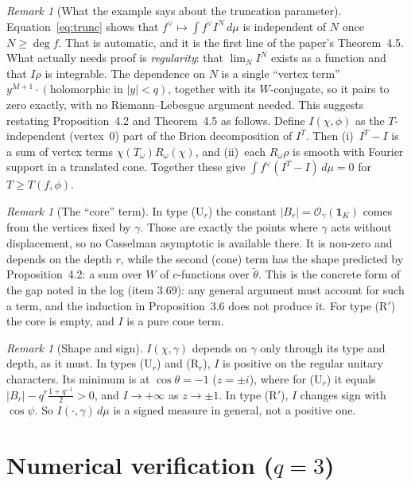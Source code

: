 \documentclass[11pt]{article}
\theoremstyle{remark}
\newtheorem{remark}[proposition]{Remark}
\newcommand{\OO}{\mathcal{O}}
\begin{document}
\begin{remark}[What the example says about the truncation parameter]\label{rem:T}
Equation~\eqref{eq:trunc} shows that $f^\vee\mapsto\int f^\vee I^N\,d\mu$ is independent of $N$ once $N\ge\deg f$. That is automatic, and it is the first line of the paper's Theorem~4.5. What actually needs proof is \emph{regularity}: that $\lim_N I^N$ exists as a function and that $I\rho$ is integrable. The dependence on $N$ is a single ``vertex term'' $y^{M+1}\cdot(\text{holomorphic in }|y|<q)$, together with its $W$-conjugate, so it pairs to zero exactly, with no Riemann--Lebesgue argument needed. This suggests restating Proposition~4.2 and Theorem~4.5 as follows. Define $I(\chi,\phi)$ as the $T$-independent (vertex~$0$) part of the Brion decomposition of $I^T$. Then (i)~$I^T-I$ is a sum of vertex terms $\chi(T_\omega)R_\omega(\chi)$, and (ii)~each $R_\omega\rho$ is smooth with Fourier support in a translated cone. Together these give $\int f^\vee(I^T-I)\,d\mu=0$ for $T\ge T(f,\phi)$.
\end{remark}

\begin{remark}[The ``core'' term]
In type (U$_r$) the constant $|B_r|=\OO_\gamma(\mathbf 1_K)$ comes from the vertices fixed by $\gamma$. Those are exactly the points where $\gamma$ acts without displacement, so no Casselman asymptotic is available there. It is non-zero and depends on the depth $r$, while the second (cone) term has the shape predicted by Proposition~4.2: a sum over $W$ of $c$-functions over $\tilde\theta$. This is the concrete form of the gap noted in the log (item 3.69): any general argument must account for such a term, and the induction in Proposition~3.6 does not produce it. For type (R$'$) the core is empty, and $I$ is a pure cone term.
\end{remark}

\begin{remark}[Shape and sign]
$I(\chi,\gamma)$ depends on $\gamma$ only through its type and depth, as it must. In types (U$_r$) and (R$_r$), $I$ is positive on the regular unitary characters. Its minimum is at $\cos\theta=-1$ ($z=\pm i$), where for (U$_r$) it equals $|B_r|-q^r\frac{1+q^{-1}}{2}>0$, and $I\to+\infty$ as $z\to\pm1$. In type (R$'$), $I$ changes sign with $\cos\psi$. So $I(\cdot,\gamma)\,d\mu$ is a signed measure in general, not a positive one.
\end{remark}

\section{Numerical verification ($q=3$)}
\end{document}

